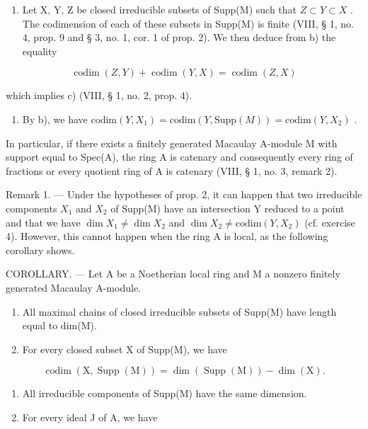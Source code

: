 \begin{enumerate}
\def\labelenumi{\alph{enumi})}
\setcounter{enumi}{2}
\tightlist
\item
  Let X, Y, Z be closed irreducible subsets of Supp(M) such that \(Z \subset Y \subset X\) . The codimension of each of these subsets in Supp(M) is finite (VIII, § 1, no. 4, prop. 9 and § 3, no. 1, cor. 1 of prop. 2). We then deduce from b) the equality
\end{enumerate}

\[
\operatorname{codim} (Z, Y) + \operatorname{codim} (Y, X) = \operatorname{codim} (Z, X)
\]

which implies c) (VIII, § 1, no. 2, prop. 4).

\begin{enumerate}
\def\labelenumi{\alph{enumi})}
\setcounter{enumi}{3}
\tightlist
\item
  By b), we have \(\text{codim}(Y, X_1) = \text{codim}(Y, \text{Supp}(M)) = \text{codim}(Y, X_2)\) .
\end{enumerate}

In particular, if there exists a finitely generated Macaulay A-module M with support equal to Spec(A), the ring A is catenary and consequently every ring of fractions or every quotient ring of A is catenary (VIII, § 1, no. 3, remark 2).

Remark 1. — Under the hypotheses of prop. 2, it can happen that two irreducible components \(X_{1}\) and \(X_{2}\) of Supp(M) have an intersection Y reduced to a point and that we have \(\dim X_{1} \neq \dim X_{2}\) and \(\dim X_{2} \neq \text{codim}(Y, X_{2})\) (cf. exercise 4). However, this cannot happen when the ring A is local, as the following corollary shows.

COROLLARY. — Let A be a Noetherian local ring and M a nonzero finitely generated Macaulay A-module.

\begin{enumerate}
\def\labelenumi{\alph{enumi})}
\item
  All maximal chains of closed irreducible subsets of Supp(M) have length equal to dim(M).
\item
  For every closed subset X of Supp(M), we have
\end{enumerate}

\[
\operatorname{codim} (\mathrm{X}, \operatorname{Supp} (\mathrm{M})) = \dim (\operatorname{Supp} (\mathrm{M})) - \dim (\mathrm{X}).
\]

\begin{enumerate}
\def\labelenumi{\alph{enumi})}
\setcounter{enumi}{2}
\item
  All irreducible components of Supp(M) have the same dimension.
\item
  For every ideal J of A, we have
\end{enumerate}

